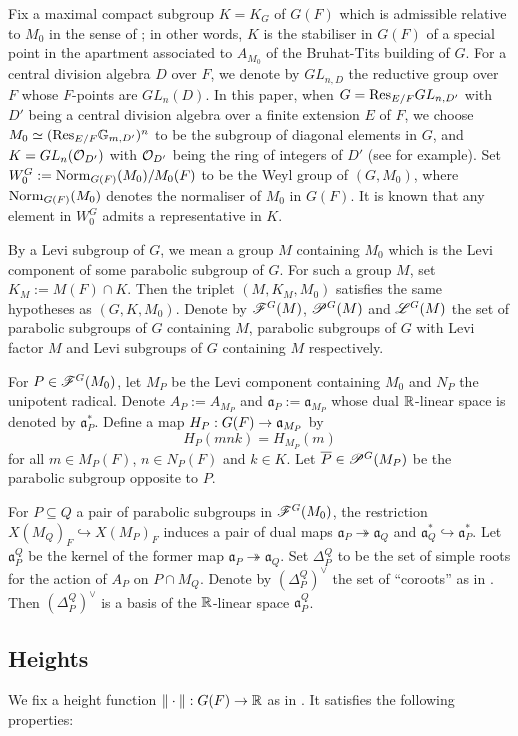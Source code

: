 \documentclass[a4paper]{amsart}
\newcommand{\fa}{{\mathfrak{a}}} \newcommand{\fb}{{\mathfrak{b}}}\newcommand{\fc}{{\mathfrak{c}}} \newcommand{\fd}{{\mathfrak{d}}}
\newcommand{\ov}{\overline}
\theoremstyle{definition}
\theoremstyle{remark}
\numberwithin{equation}{subsection}
\begin{document}
Fix a maximal compact subgroup $K=K_G$ of $G(F)$ which is admissible relative to $M_0$ in the sense of \cite[p. 9]{MR625344}; in other words, $K$ is the stabiliser in $G(F)$ of a special point in the apartment associated to $A_{M_0}$ of the Bruhat-Tits building of $G$. For a central division algebra $D$ over $F$, we denote by $GL_{n,D}$ the reductive group over $F$ whose $F$-points are $GL_n(D)$. In this paper, when $G={\mathrm{Res}}_{E/F} GL_{n,D'}$ with $D'$ being a central division algebra over a finite extension $E$ of $F$, we choose $M_0\simeq({\mathrm{Res}}_{E/F} {\mathbb {G}}_{m,D'})^n$ to be the subgroup of diagonal elements in $G$, and $K=GL_n({\mathcal {O}}_{D'})$ with ${\mathcal {O}}_{D'}$ being the ring of integers of $D'$ (see \cite[p. 191]{MR1344916} for example). Set $W_0^G:={\mathrm{Norm}}_{G(F)}(M_0)/M_0(F)$ to be the Weyl group of $(G, M_0)$, where ${\mathrm{Norm}}_{G(F)}(M_0)$ denotes the normaliser of $M_0$ in $G(F)$. It is known that any element in $W_0^G$ admits a representative in $K$. 

By a Levi subgroup of $G$, we mean a group $M$ containing $M_0$ which is the Levi component of some parabolic subgroup of $G$. For such a group $M$, set $K_M:=M(F)\cap K$. Then the triplet $(M,K_M,M_0)$ satisfies the same hypotheses as $(G,K,M_0)$. Denote by $\mathscr{F}^G(M)$, $\mathscr{P}^G(M)$ and $\mathscr{L}^G(M)$ the set of parabolic subgroups of $G$ containing $M$, parabolic subgroups of $G$ with Levi factor $M$ and Levi subgroups of $G$ containing $M$ respectively. 

For $P\in\mathscr{F}^G(M_0)$, let $M_P$ be the Levi component containing $M_0$ and $N_P$ the unipotent radical. Denote $A_P:=A_{M_P}$ and $\fa_P:=\fa_{M_P}$ whose dual ${\mathbb {R}}$-linear space is denoted by $\fa_P^*$. Define a map $H_P: G(F)\ra\fa_{M_P}$ by
$$ H_P(mnk)=H_{M_P}(m) $$
for all $m\in M_P(F)$, $n\in N_P(F)$ and $k\in K$. Let $\ov{P}\in\msp^G(M_P)$ be the parabolic subgroup opposite to $P$. 

For $P\subseteq Q$ a pair of parabolic subgroups in $\mathscr{F}^G(M_0)$, the restriction $X(M_Q)_F\hookrightarrow X(M_P)_F$ induces a pair of dual maps $\fa_P\twoheadrightarrow\fa_Q$ and $\fa_Q^*\hookrightarrow \fa_P^*$. Let $\fa_P^Q$ be the kernel of the former map $\fa_P\twoheadrightarrow\fa_Q$. Set $\Delta_P^Q$ to be the set of simple roots for the action of $A_P$ on $P\cap M_Q$. Denote by $(\Delta_P^Q)^\vee$ the set of ``coroots'' as in \cite[p. 26]{MR2192011}. Then $(\Delta_P^Q)^\vee$ is a basis of the ${\mathbb {R}}$-linear space $\fa_P^Q$. 

\subsection{Heights}
We fix a height function $\|\cdot\|: G(F)\rightarrow{\mathbb {R}}$ as in \cite[\S4]{MR1114210}. It satisfies the following properties: 
\end{document}
